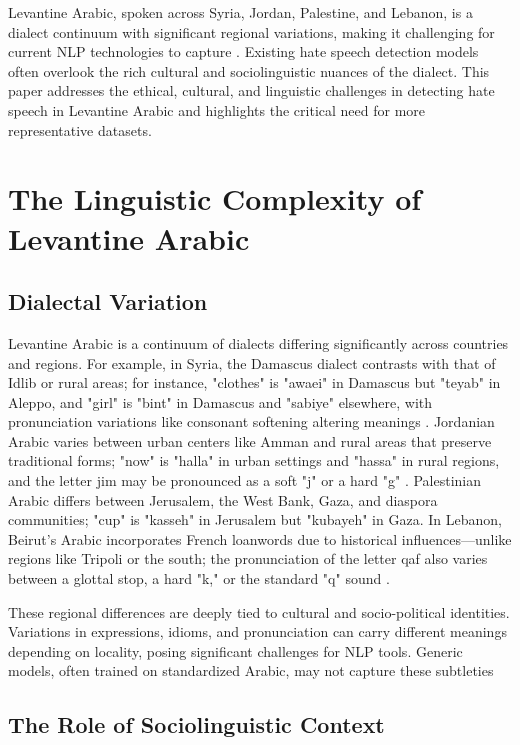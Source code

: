 \documentclass[11pt]{article}
\begin{document}
Levantine Arabic, spoken across Syria, Jordan, Palestine, and Lebanon, is a dialect continuum with significant regional variations, making it challenging for current NLP technologies to capture \citep{haff2022currasbaladilevantine}. Existing hate speech detection models often overlook the rich cultural and sociolinguistic nuances of the dialect. This paper addresses the ethical, cultural, and linguistic challenges in detecting hate speech in Levantine Arabic and highlights the critical need for more representative datasets.


\section{The Linguistic Complexity of Levantine Arabic}

\subsection{Dialectal Variation}

Levantine Arabic is a continuum of dialects differing significantly across countries and regions. For example, in Syria, the Damascus dialect contrasts with that of Idlib or rural areas; for instance, "clothes" is "awaei" in Damascus but "teyab" in Aleppo, and "girl" is "bint" in Damascus and "sabiye" elsewhere, with pronunciation variations like consonant softening altering meanings \citep{Naïm+2012+920+935}. Jordanian Arabic varies between urban centers like Amman and rural areas that preserve traditional forms; "now" is "halla" in urban settings and "hassa" in rural regions, and the letter jim may be pronounced as a soft "j" or a hard "g" \citep{c3909b9d-f472-38b7-b06d-dfca0dcd22bb}. Palestinian Arabic differs between Jerusalem, the West Bank, Gaza, and diaspora communities; "cup" is "kasseh" in Jerusalem but "kubayeh" in Gaza. In Lebanon, Beirut's Arabic incorporates French loanwords due to historical influences—unlike regions like Tripoli or the south; the pronunciation of the letter qaf also varies between a glottal stop, a hard "k," or the standard "q" sound \citep{obégi1971phonemic, Naïm+2012+920+935}.

These regional differences are deeply tied to cultural and socio-political identities. Variations in expressions, idioms, and pronunciation can carry different meanings depending on locality, posing significant challenges for NLP tools. Generic models, often trained on standardized Arabic, may not capture these subtleties


\subsection{The Role of Sociolinguistic Context}
\end{document}
